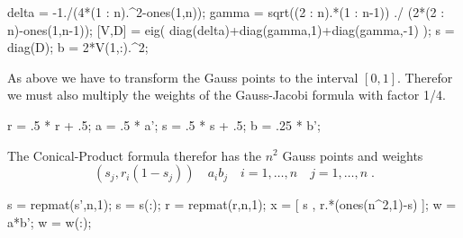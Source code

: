 %
\begin{pcode}
delta = -1./(4*(1 : n).^2-ones(1,n));
gamma = sqrt((2 : n).*(1 : n-1)) ./ (2*(2 : n)-ones(1,n-1));
[V,D] = eig( diag(delta)+diag(gamma,1)+diag(gamma,-1) );
s = diag(D);
b = 2*V(1,:).^2;
\end{pcode}
As above we have to transform the Gauss points to the interval $[0,1]$. Therefor we must also
multiply the weights of the Gauss-Jacobi formula with factor 1/4.
\begin{pcode}
r = .5 * r + .5;
a = .5 * a';
s = .5 * s + .5;
b = .25 * b';
\end{pcode}
The Conical-Product formula therefor has the $n^2$ Gauss points and weights
\begin{equation*}
    ( s_j , r_i(1-s_j) ) \quad a_i b_j \quad i=1,\ldots,n\quad j=1,\ldots,n\;.
\end{equation*}
\begin{pcode}
s = repmat(s',n,1); s = s(:);
r = repmat(r,n,1);
x = [ s , r.*(ones(n^2,1)-s) ];
w = a*b';
w = w(:);
\end{pcode}
